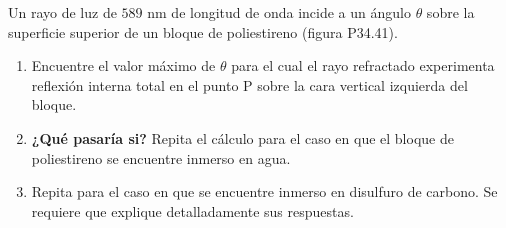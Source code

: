 \item Un rayo de luz de $589\text{ nm}$ de longitud de onda incide a un ángulo $\theta$ sobre la superficie superior de un bloque de poliestireno (figura P34.41).
\begin{enumerate}
    \item Encuentre el valor máximo de $\theta$ para el cual el rayo refractado experimenta reflexión interna total en el punto P sobre la cara vertical izquierda del bloque.
    \item \textbf{¿Qué pasaría si?} Repita el cálculo para el caso en que el bloque de poliestireno se encuentre inmerso en agua.
    \item Repita para el caso en que se encuentre inmerso en disulfuro de carbono. Se requiere que explique detalladamente sus respuestas.
\end{enumerate}